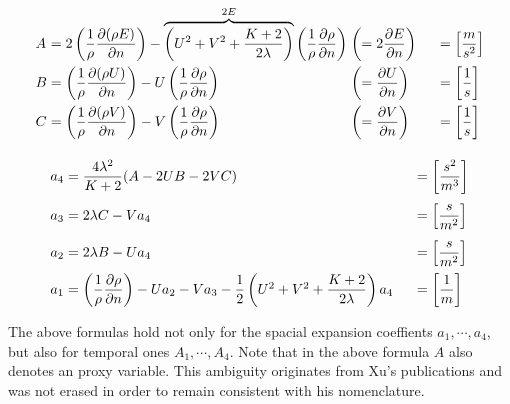 \documentclass[
	pdftex,             %
	12pt,				%
	a4paper,		   	%
	english,				%
	oneside,			%
]{article}
\begin{document}
\begin{equation}
\arraycolsep=1.4pt\def\arraystretch{2.2}
\begin{array}{lclll}
A &=& 2 \left( \dfrac{1}{\rho}\dfrac{\partial (\rho E)}{\partial n} \right)
  - \overbrace{ \left( U^2 + V^2 + \dfrac{K+2}{2\lambda} \right) }^{2E}
  \left( \dfrac{1}{\rho}\dfrac{\partial\rho}{\partial n} \right)
    &\left( = 2 \dfrac{\partial E}{\partial n} \right)
    & \hspace{0.5cm} = \left[\dfrac{m}{s^2} \right]
\\
B &=& \left( \dfrac{1}{\rho}\dfrac{\partial (\rho U)}{\partial n} \right)
   - U\left(\dfrac{1}{\rho}\dfrac{\partial \rho}{\partial n} \right)
	&\left( = \dfrac{\partial U}{\partial n} \right)
    & \hspace{0.5cm} = \left[\dfrac{1}{s} \right]
\\
C &=& \left( \dfrac{1}{\rho}\dfrac{\partial (\rho V)}{\partial n} \right)
   - V\left( \dfrac{1}{\rho}\dfrac{\partial \rho}{\partial n} \right)
	&\left( = \dfrac{\partial V}{\partial n} \right)
    & \hspace{0.5cm} = \left[\dfrac{1}{s} \right]
\end{array}
\end{equation}

\begin{equation}
\arraycolsep=1.4pt\def\arraystretch{2.2}
\begin{array}{lcll}
a_4 &=& \dfrac{4 \lambda^2}{K+2} ( A - 2 U B - 2 V C )
    & \hspace{0.5cm} = \left[\dfrac{s^2}{m^3} \right]
\\
a_3 &=& 2 \lambda C - V a_4
    & \hspace{0.5cm} = \left[\dfrac{s}{m^2} \right]
\\
a_2 &=& 2 \lambda B - U a_4
    & \hspace{0.5cm} = \left[\dfrac{s}{m^2} \right]
\\
a_1 &=& \left( \dfrac{1}{\rho} \dfrac{\partial \rho}{\partial n} \right)
     - U a_2 - V a_3 - \dfrac{1}{2} \left( U^2 + V^2 + \dfrac{K+2}{2\lambda} \right) a_4
    & \hspace{0.5cm} = \left[\dfrac{1}{m} \right]
\end{array}
\end{equation}

The above formulas hold not only for the spacial expansion coeffients $a_1, \cdots, a_4$, but also for temporal ones $A_1, \cdots, A_4$. Note that in the above formula $A$ also denotes an proxy variable. This ambiguity originates from Xu's publications and was not erased in order to remain consistent with his nomenclature.
\end{document}
